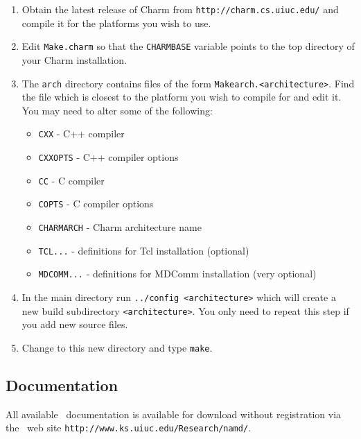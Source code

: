 \begin{enumerate}
\item
Obtain the latest release of Charm from {\tt http://charm.cs.uiuc.edu/}
and compile it for the platforms you wish to use.
\item
Edit {\tt Make.charm} so that the {\tt CHARMBASE} variable
points to the top directory of your Charm installation.
\item 
The {\tt arch} directory contains files of the form {\tt Makearch.<architecture>}.
Find the file which is closest to the platform you wish to compile for and
edit it.  You may need to alter some of the following:
\begin{itemize}
\item {\tt CXX} - C++ compiler
\item {\tt CXXOPTS} - C++ compiler options
\item {\tt CC} - C compiler
\item {\tt COPTS} - C compiler options
\item {\tt CHARMARCH} - Charm architecture name
\item {\tt TCL...} - definitions for Tcl installation (optional)
\item {\tt MDCOMM...} - definitions for MDComm installation (very optional)
\end{itemize}
\item
In the main directory run {\tt ../config <architecture>}
which will create a new build subdirectory {\tt <architecture>}.
You only need to repeat this step if you add new source files.
\item 
Change to this new directory and type {\tt make}.
\end{enumerate}

\subsection{Documentation}

All available \NAMD\ documentation is available for download without
registration via the \NAMD\ web site
{\tt http://www.ks.uiuc.edu/Research/namd/}.



